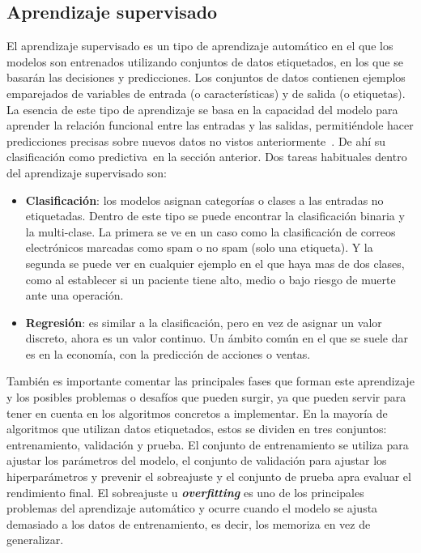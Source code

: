 \subsection{Aprendizaje supervisado}
El aprendizaje supervisado es un tipo de aprendizaje automático en el que los modelos son entrenados utilizando conjuntos de datos etiquetados, en los que se basarán las decisiones y predicciones. Los conjuntos de datos contienen ejemplos emparejados de variables de entrada (o características) y de salida (o etiquetas). La esencia de este tipo de aprendizaje se basa en la capacidad del modelo para aprender la relación funcional entre las entradas y las salidas, permitiéndole hacer predicciones precisas sobre nuevos datos no vistos anteriormente~\cite{SL:guide}. De ahí su clasificación como \guillemetleft predictiva\guillemetright ~en la sección anterior.
Dos tareas habituales dentro del aprendizaje supervisado son:
\begin{itemize}
	\item \textbf{Clasificación}: los modelos asignan categorías o clases a las entradas no etiquetadas. Dentro de este tipo se puede encontrar la clasificación binaria y la multi-clase. La primera se ve en un caso como la clasificación de correos electrónicos marcadas como spam o no spam (solo una etiqueta). Y la segunda se puede ver en cualquier ejemplo en el que haya mas de dos clases, como al establecer si un paciente tiene alto, medio o bajo riesgo de muerte ante una operación.
	\item \textbf{Regresión}: es similar a la clasificación, pero en vez de asignar un valor discreto, ahora es un valor continuo. Un ámbito común en el que se suele dar es en la economía, con la predicción de acciones o ventas.
\end{itemize}

También es importante comentar las principales fases que forman este aprendizaje y los posibles problemas o desafíos que pueden surgir, ya que pueden servir para tener en cuenta en los algoritmos concretos a implementar.
En la mayoría de algoritmos que utilizan datos etiquetados, estos se dividen en tres conjuntos: entrenamiento, validación y prueba. El conjunto de entrenamiento se utiliza para ajustar los parámetros del modelo, el conjunto de validación para ajustar los hiperparámetros y prevenir el sobreajuste y el conjunto de prueba apra evaluar el rendimiento final.
El sobreajuste u \textit{\textbf{overfitting}} es uno de los principales problemas del aprendizaje automático y ocurre cuando el modelo se ajusta demasiado a los datos de entrenamiento, es decir, los memoriza en vez de generalizar.

